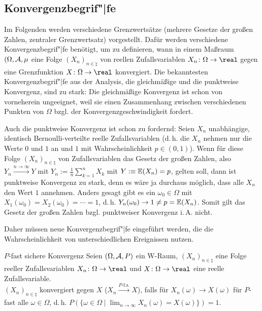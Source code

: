 \pagebreak

\subsection{%
    Konvergenzbegrif"|fe%
}

\begin{Bem}
    Im Folgenden werden verschiedene Grenzwertsätze
    (mehrere Gesetze der großen Zahlen, zentraler Grenzwertsatz) vorgestellt.
    Dafür werden verschiedene Konvergenzbegrif"|fe benötigt,
    um zu definieren, wann in einem Maßraum $(\Omega, \mathcal{A}, \mu$ eine Folge
    $(X_n)_{n \in \natural}$ von reellen Zufallsvariablen $X_n\colon \Omega \rightarrow \real$
    gegen eine Grenzfunktion $X\colon \Omega \rightarrow \real$ konvergiert.
    Die bekanntesten Konvergenzbegrif"|fe aus der
    Analysis, die gleichmäßige und die punktweise Konvergenz, sind zu stark:
    Die gleichmäßige Konvergenz ist schon von vorneherein ungeeignet, weil sie einen Zusammenhang
    zwischen verschiedenen Punkten von $\Omega$ bzgl. der Konvergenzgeschwindigkeit fordert.
    
    Auch die punktweise Konvergenz ist schon zu fordernd:
    Seien $X_n$ unabhängige, identisch Ber\-noulli-verteilte reelle Zufallsvariablen
    (d.\,h. die $X_n$ nehmen nur die Werte $0$ und $1$ an und $1$ mit Wahrscheinlichkeit
    $p \in (0, 1)$).
    Wenn für diese Folge $(X_n)_{n \in \natural}$ von Zufallsvariablen das Gesetz der großen
    Zahlen, also $Y_n \xrightarrow{n \to \infty} Y$ mit $Y_n := \frac{1}{n} \sum_{k=1}^n X_k$ mit
    $Y :\equiv \mathbb{E}(X_n) = p$, gelten soll, dann ist punktweise Konvergenz zu stark,
    denn es wäre ja durchaus möglich, dass alle $X_n$ den Wert $1$ annehmen.
    Anders gesagt gibt es ein $\omega_0 \in \Omega$ mit
    $X_1(\omega_0) = X_2(\omega_0) = \dotsb = 1$, d.\,h. $Y_n(\omega_0) \to 1 \not= p = \mathbb{E}(X_n)$.
    Somit gilt das Gesetz der großen Zahlen bzgl. punktweiser Konvergenz i.\,A. nicht.
    
    Daher müssen neue Konvergenzbegrif"|fe eingeführt werden, die die
    Wahrscheinlichkeit von unterschiedlichen Ereignissen nutzen.
\end{Bem}

\linie

\begin{Def}{$P$-fast sichere Konvergenz}
    Seien $(\Omega, \mathcal{A}, P)$ ein W-Raum,
    $(X_n)_{n \in \natural}$ eine Folge reeller Zufallsvariablen
    $X_n\colon \Omega \rightarrow \real$ und
    $X\colon \Omega \rightarrow \real$ eine reelle Zufallsvariable.\\
    $(X_n)_{n \in \natural}$ konvergiert  gegen $X$
    ($X_n \xrightarrow{P\text{-f.s.}} X$), falls
    für $X_n(\omega) \to X(\omega)$ für $P$-fast alle $\omega \in \Omega$,
    d.\,h. $P(\{\omega \in \Omega \;|\; \lim_{n \to \infty} X_n(\omega) = X(\omega)\}) = 1$.
\end{Def}

